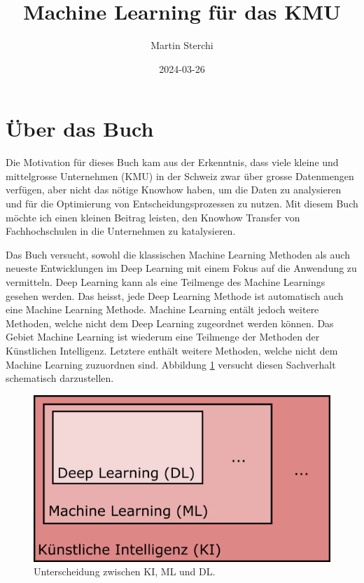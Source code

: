 \documentclass[
]{book}
\title{Machine Learning für das KMU}
\author{Martin Sterchi}
\date{2024-03-26}
\begin{document}
\maketitle

{
\setcounter{tocdepth}{1}
\tableofcontents
}
\hypertarget{uxfcber-das-buch}{%
\chapter*{Über das Buch}\label{uxfcber-das-buch}}

Die Motivation für dieses Buch kam aus der Erkenntnis, dass viele kleine und mittelgrosse Unternehmen (KMU) in der Schweiz zwar über grosse Datenmengen verfügen, aber nicht das nötige Knowhow haben, um die Daten zu analysieren und für die Optimierung von Entscheidungsprozessen zu nutzen. Mit diesem Buch möchte ich einen kleinen Beitrag leisten, den Knowhow Transfer von Fachhochschulen in die Unternehmen zu katalysieren.

Das Buch versucht, sowohl die klassischen Machine Learning Methoden als auch neueste Entwicklungen im Deep Learning mit einem Fokus auf die Anwendung zu vermitteln. Deep Learning kann als eine Teilmenge des Machine Learnings gesehen werden. Das heisst, jede Deep Learning Methode ist automatisch auch eine Machine Learning Methode. Machine Learning entält jedoch weitere Methoden, welche nicht dem Deep Learning zugeordnet werden können. Das Gebiet Machine Learning ist wiederum eine Teilmenge der Methoden der Künstlichen Intelligenz. Letztere enthält weitere Methoden, welche nicht dem Machine Learning zuzuordnen sind. Abbildung \ref{fig:kimldl} versucht diesen Sachverhalt schematisch darzustellen.

\begin{figure}

{\centering \includegraphics[width=0.6\linewidth]{images/KI_ML_DL} 

}

\caption{Unterscheidung zwischen KI, ML und DL. }\label{fig:kimldl}
\end{figure}
\end{document}
